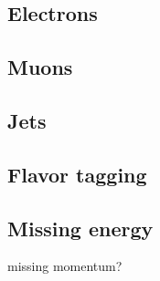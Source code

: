 \subsection{Electrons} 

\subsection{Muons} 

\subsection{Jets} 

\subsection{Flavor tagging} 

\subsection{Missing energy} 

{\color{red} missing momentum?}

